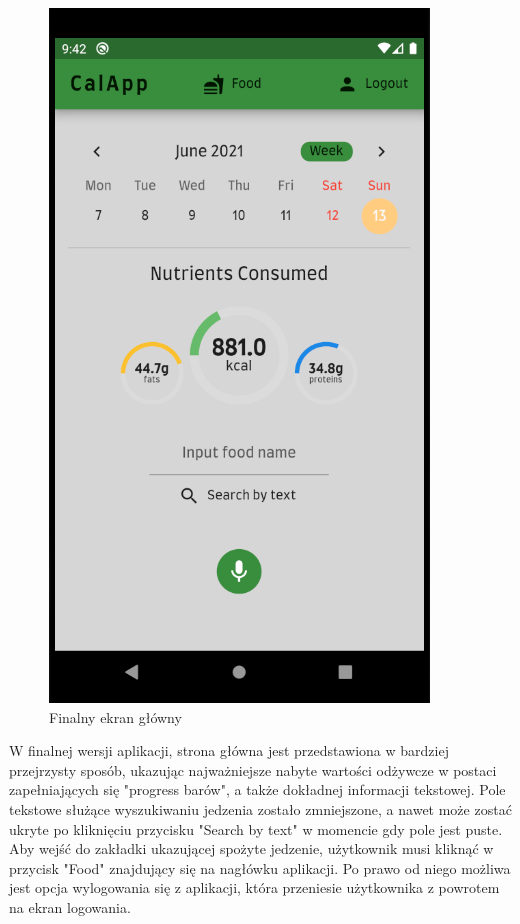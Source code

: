 \documentclass[12pt, a4paper]{article}
\begin{document}
\begin{sloppypar}
{{    \begin{figure}[H]
      \centering
      \includegraphics[scale=0.9]{screen_home.PNG}
      \caption{Finalny ekran główny}
      \label{fig:screen_home}
    \end{figure} 

    W finalnej wersji aplikacji, strona główna jest przedstawiona w bardziej przejrzysty
    sposób, ukazując najważniejsze nabyte wartości odżywcze w postaci zapełniających się
    "progress barów", a także dokładnej informacji tekstowej. Pole tekstowe służące
    wyszukiwaniu jedzenia zostało zmniejszone, a nawet może zostać ukryte po kliknięciu
    przycisku "Search by text" w momencie gdy pole jest puste. Aby wejść do zakładki ukazującej
    spożyte jedzenie, użytkownik musi kliknąć w przycisk "Food" znajdujący się na nagłówku
    aplikacji. Po prawo od niego możliwa jest opcja wylogowania się z aplikacji, która przeniesie
    użytkownika z powrotem na ekran logowania.

}}
\end{sloppypar}
\end{document}
